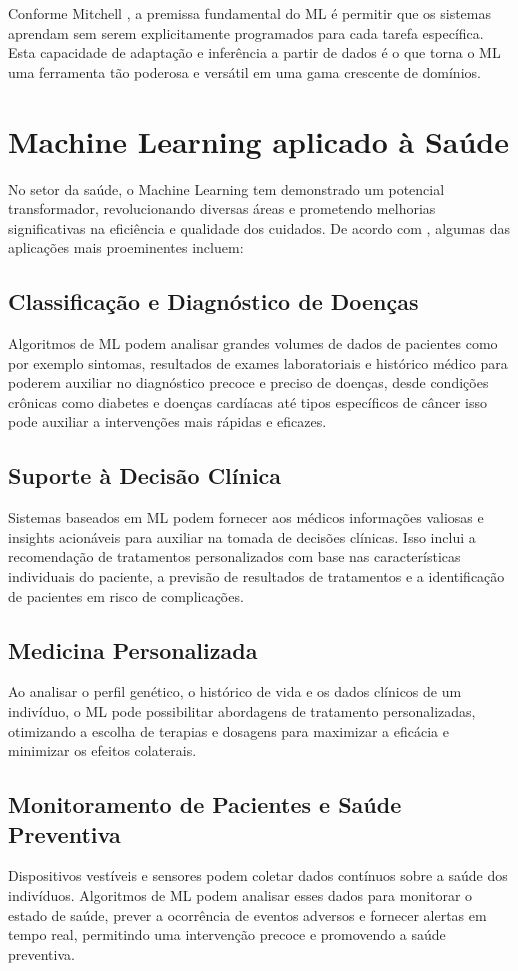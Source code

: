 Conforme Mitchell \cite{Mitchell1997}, a premissa fundamental do ML é permitir que os sistemas aprendam sem serem explicitamente programados para cada tarefa específica. Esta capacidade de adaptação e inferência a partir de dados é o que torna o ML uma ferramenta tão poderosa e versátil em uma gama crescente de domínios.


\section{Machine Learning aplicado à Saúde}
No setor da saúde, o Machine Learning tem demonstrado um potencial transformador, revolucionando diversas áreas e prometendo melhorias significativas na eficiência e qualidade dos cuidados. De acordo com \cite{AlZubaidi2021}, algumas das aplicações mais proeminentes incluem:

\subsection{Classificação e Diagnóstico de Doenças}
Algoritmos de ML podem analisar grandes volumes de dados de pacientes como por exemplo sintomas, resultados de exames laboratoriais e histórico médico para poderem auxiliar no diagnóstico precoce e preciso de doenças, desde condições crônicas como diabetes e doenças cardíacas até tipos específicos de câncer isso pode auxiliar a intervenções mais rápidas e eficazes.

\subsection{Suporte à Decisão Clínica}
Sistemas baseados em ML podem fornecer aos médicos informações valiosas e insights acionáveis para auxiliar na tomada de decisões clínicas. Isso inclui a recomendação de tratamentos personalizados com base nas características individuais do paciente, a previsão de resultados de tratamentos e a identificação de pacientes em risco de complicações.

\subsection{Medicina Personalizada}
Ao analisar o perfil genético, o histórico de vida e os dados clínicos de um indivíduo, o ML pode possibilitar abordagens de tratamento personalizadas, otimizando a escolha de terapias e dosagens para maximizar a eficácia e minimizar os efeitos colaterais.

\subsection{Monitoramento de Pacientes e Saúde Preventiva}
Dispositivos vestíveis e sensores podem coletar dados contínuos sobre a saúde dos indivíduos. Algoritmos de ML podem analisar esses dados para monitorar o estado de saúde, prever a ocorrência de eventos adversos e fornecer alertas em tempo real, permitindo uma intervenção precoce e promovendo a saúde preventiva.

